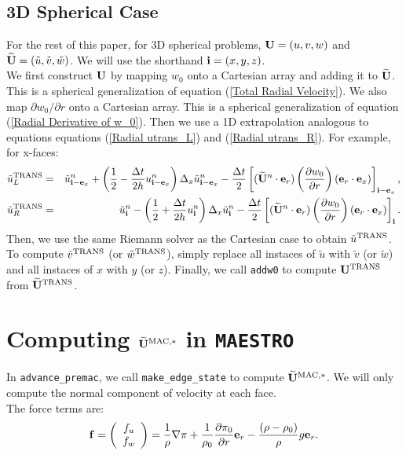 \documentclass[11pt]{article}
\def\half  {\frac{1}{2}}
\def\dt    {\Delta t}
\def\mac   {\rm MAC}
\def\trans {\rm TRANS}
\def\eb    {{\bf e}}
\def\fb    {{\bf f}}
\def\ib    {{\bf i}}
\def\Ub    {{\bf U}}
\def\Ubt   {\widetilde{\bf U}}
\def\ut    {\tilde{u}}
\def\vt    {\tilde{v}}
\def\wt    {\tilde{w}}
\begin{document}
\subsection{3D Spherical Case}
For the rest of this paper, for 3D spherical problems, $\Ub = (u,v,w)$ and $\Ubt = (\ut,\vt,\wt)$.  We will use the shorthand $\ib = (x,y,z)$.\\

We first construct $\Ub$ by mapping $w_0$ onto a Cartesian array and adding it to $\Ubt$.  This is a spherical generalization of equation (\ref{Total Radial Velocity}).  We also map $\partial w_0/\partial r$ onto a Cartesian array.  This is a spherical generalization of equation (\ref{Radial Derivative of w_0}).  Then we use a 1D extrapolation analogous to equations equations (\ref{Radial utrans_L}) and (\ref{Radial utrans_R}).  For example, for x-faces:
\begin{eqnarray}
\ut_L^{\trans} &=& \ut_{\ib-\eb_x}^n + \left(\half - \frac{\dt}{2h}u_{\ib-\eb_x}^n\right)\Delta_x\ut_{\ib-\eb_x}^n - \frac{\dt}{2}\left[(\Ubt^n\cdot\eb_r)\left(\frac{\partial w_0}{\partial r}\right)(\eb_r\cdot\eb_x)\right]_{\ib-\eb_x}, \\
\ut_R^{\trans} &=& \ut_{\ib}^n - \left(\half + \frac{\dt}{2h}u_{\ib}^n\right)\Delta_x\ut_{\ib}^n - \frac{\dt}{2}\left[(\Ubt^n\cdot\eb_r)\left(\frac{\partial w_0}{\partial r}\right)(\eb_r\cdot\eb_x)\right]_{\ib}.
\end{eqnarray}
Then, we use the same Riemann solver as the Cartesian case to obtain $\ut^{\trans}$.  To compute $\vt^{\trans}$ (or $\wt^{\trans}$), simply replace all instaces of $\ut$ with $\vt$ (or $\wt$) and all instaces of $x$ with $y$ (or $z$).  Finally, we call {\tt addw0} to compute $\Ub^{\trans}$ from $\Ubt^{\trans}$.
\cleardoublepage
\section{Computing $\Ubt^{\mac,*}$ in {\tt MAESTRO}}
In {\tt advance\_premac}, we call {\tt make\_edge\_state} to compute $\Ubt^{\mac,*}$.  We will only compute the normal component of velocity at each face.\\

The force terms are:
\begin{equation}
\fb =
\left(\begin{array}{c}
f_u \\
f_w \\
\end{array}\right)
= \frac{1}{\rho}\nabla\pi + \frac{1}{\rho_0}\frac{\partial\pi_0}{\partial r}\eb_r - \frac{(\rho-\rho_0)}{\rho}g\eb_r.\label{Force Term}
\end{equation}
\end{document}
